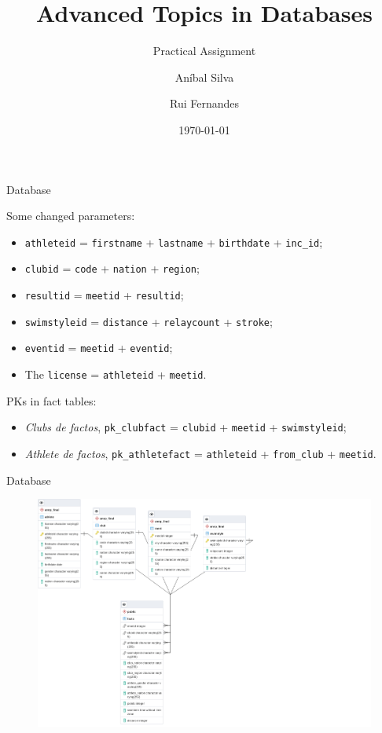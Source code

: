 \documentclass[aspectratio=169, xcolor=dvipsnames]{beamer}
\title{Advanced Topics in Databases}
\subtitle{Practical Assignment}
\author{Aníbal Silva \and Rui Fernandes}
\date{\today}
\begin{document}
\renewcommand{\today}{\ifcase \month\or January\or February\or March\or %
April\or May\or June\or July\or August\or September\or October\or November\or %
December\fi, \number \year}

\begin{frame}
    \titlepage
\end{frame}

\begin{frame}{Database}

\begin{block}{Some changed parameters:}

\begin{itemize}
    \item \texttt{athleteid} = \texttt{firstname} + \texttt{lastname} + \texttt{birthdate} + \texttt{inc\_id};
    \item \texttt{clubid} = \texttt{code} + \texttt{nation} + \texttt{region};
    \item \texttt{resultid} = \texttt{meetid} + \texttt{resultid};
    \item \texttt{swimstyleid} = \texttt{distance} + \texttt{relaycount} + \texttt{stroke};
    \item \texttt{eventid} = \texttt{meetid} + \texttt{eventid};
    \item The \texttt{license} = \texttt{athleteid} + \texttt{meetid}.
\end{itemize}
    
\end{block}

\begin{block}{PKs in fact tables:}
    \begin{itemize}
        \item \textit{Clubs de factos}, \texttt{pk\_clubfact} = \texttt{clubid} + \texttt{meetid} + \texttt{swimstyleid};
        \item \textit{Athlete de factos}, \texttt{pk\_athletefact} = \texttt{athleteid} + \texttt{from\_club} + \texttt{meetid}.
    \end{itemize}
\end{block}


\end{frame}

\begin{frame}{Database}
    \begin{figure}[H]
        \centering
        \includegraphics[width=.7\textwidth]{img/er.png}
    \end{figure}
\end{frame}
\end{document}
